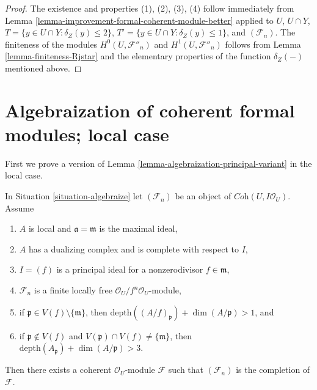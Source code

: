 \begin{proof}
The existence and properties (1), (2), (3), (4) follow immediately from
Lemma \ref{lemma-improvement-formal-coherent-module-better} applied
to $U$, $U \cap Y$, $T = \{y \in U \cap Y : \delta_Z(y) \leq 2\}$,
$T' = \{y \in U \cap Y : \delta_Z(y) \leq 1\}$, and $(\mathcal{F}_n)$.
The finiteness of the modules $H^0(U, \mathcal{F}''_n)$ and
$H^1(U, \mathcal{F}''_n)$ follows from
Lemma \ref{lemma-finiteness-Rjstar}
and the elementary properties of the function $\delta_Z(-)$
mentioned above.
\end{proof}









\section{Algebraization of coherent formal modules; local case}
\label{section-algebraization-modules-local}

\noindent
First we prove a version of
Lemma \ref{lemma-algebraization-principal-variant} in the local case.

\begin{lemma}
\label{lemma-algebraization-principal}
In Situation \ref{situation-algebraize} let $(\mathcal{F}_n)$ be an object
of $\textit{Coh}(U, I\mathcal{O}_U)$. Assume
\begin{enumerate}
\item $A$ is local and $\mathfrak a = \mathfrak m$ is the maximal ideal,
\item $A$ has a dualizing complex and is complete with respect to $I$,
\item $I = (f)$ is a principal ideal for a nonzerodivisor $f \in \mathfrak m$,
\item $\mathcal{F}_n$ is a finite locally free
$\mathcal{O}_U/f^n\mathcal{O}_U$-module,
\item if $\mathfrak p \in V(f) \setminus \{\mathfrak m\}$, then
$\text{depth}((A/f)_\mathfrak p) + \dim(A/\mathfrak p) > 1$, and
\item if $\mathfrak p \not \in V(f)$ and
$V(\mathfrak p) \cap V(f) \not = \{\mathfrak m\}$, then
$\text{depth}(A_\mathfrak p) + \dim(A/\mathfrak p) > 3$.
\end{enumerate}
Then there exists a coherent $\mathcal{O}_U$-module
$\mathcal{F}$ such that $(\mathcal{F}_n)$ is the completion of $\mathcal{F}$.
\end{lemma}

